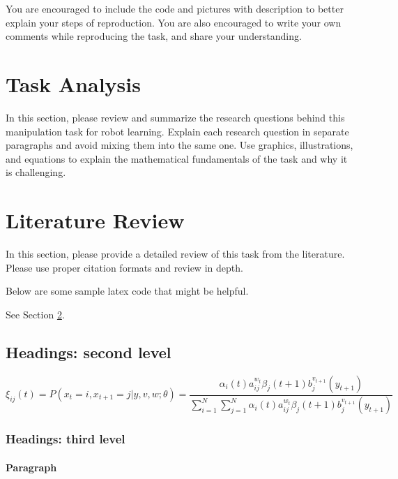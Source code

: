 \documentclass{article}
\begin{document}
You are encouraged to include the code and pictures with description to better explain your steps of reproduction. You are also encouraged to write your own comments while reproducing the task, and share your understanding.

\section{Task Analysis}
\label{sec:taskAnalysis}
In this section, please review and summarize the research questions behind this manipulation task for robot learning. Explain each research question in separate paragraphs and avoid mixing them into the same one. Use graphics, illustrations, and equations to explain the mathematical fundamentals of the task and why it is challenging.

\section{Literature Review}
\label{sec:litReview}
In this section, please provide a detailed review of this task from the literature. Please use proper citation formats and review in depth.

Below are some sample latex code that might be helpful. 

\lipsum[4] See Section \ref{sec:litReview}.

\subsection{Headings: second level}
\lipsum[5]
\begin{equation}
\xi _{ij}(t)=P(x_{t}=i,x_{t+1}=j|y,v,w;\theta)= {\frac {\alpha _{i}(t)a^{w_t}_{ij}\beta _{j}(t+1)b^{v_{t+1}}_{j}(y_{t+1})}{\sum _{i=1}^{N} \sum _{j=1}^{N} \alpha _{i}(t)a^{w_t}_{ij}\beta _{j}(t+1)b^{v_{t+1}}_{j}(y_{t+1})}}
\end{equation}

\subsubsection{Headings: third level}
\lipsum[6]

\paragraph{Paragraph}
\lipsum[7]
\end{document}
